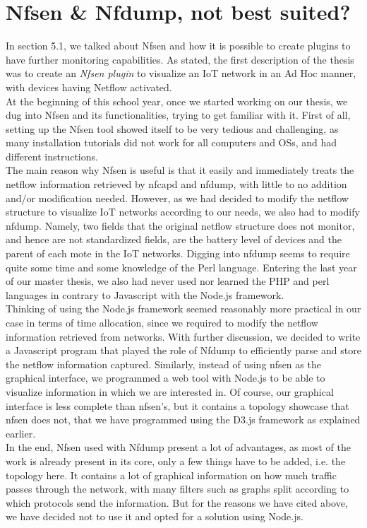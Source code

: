 \section{Nfsen \& Nfdump, not best suited?}

In section 5.1, we talked about Nfsen and how it is possible to create plugins to have further monitoring capabilities. As stated, the first description of the thesis was to create an \textit{Nfsen plugin} to visualize an IoT network in an Ad Hoc manner, with devices having Netflow activated.\\

At the beginning of this school year, once we started working on our thesis, we dug into Nfsen and its functionalities, trying to get familiar with it. First of all, setting up the Nfsen tool showed itself to be very tedious and challenging, as many installation tutorials did not work for all computers and OSs, and had different instructions.\\

The main reason why Nfsen is useful is that it easily and immediately treats the netflow information retrieved by nfcapd and nfdump, with little to no addition and/or modification needed. However, as we had decided to modify the netflow structure to visualize IoT networks according to our needs, we also had to modify nfdump. Namely, two fields that the original netflow structure does not monitor, and hence are not standardized fields, are the battery level of devices and the parent of each mote in the IoT networks. Digging into nfdump seems to require quite some time and some knowledge of the Perl language. Entering the last year of our master thesis, we also had never used nor learned the PHP and perl languages in contrary to Javascript with the Node.js framework. \\

Thinking of using the Node.js framework seemed reasonably more practical in our case in terms of time allocation, since we required to modify the netflow information retrieved from networks. With further discussion, we decided to write a Javascript program that played the role of Nfdump to efficiently parse and store the netflow information captured. Similarly, instead of using nfsen as the graphical interface, we programmed a web tool with Node.js to be able to visualize information in which we are interested in. Of course, our graphical interface is less complete than nfsen's, but it contains a topology showcase that nfsen does not, that we have programmed using the D3.js framework as explained earlier.\\

In the end, Nfsen used with Nfdump present a lot of advantages, as most of the work is already present in its core, only a few things have to be added, i.e. the topology here. It contains a lot of graphical information on how much traffic passes through the network, with many filters such as graphs split according to which protocols send the information. But for the reasons we have cited above, we have decided not to use it and opted for a solution using Node.js.

